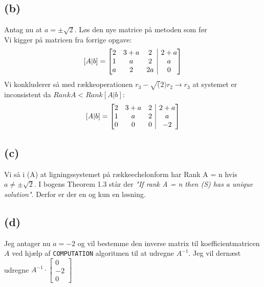 \documentclass[a4paper,fleqn]{article}
\begin{document}
	\subsection{(b)}
	Antag nu at $a = \pm\sqrt{2}$. Løs den nye matrice på metoden som før\\
	Vi kigger på matricen fra forrige opgave:
	\[ [A|b] = \left[\begin{array}{@{}ccc|c@{}}
		2	&	3+a	&	2	& 2+a\\
		1	&	a	&	2	& a\\
		a	&	2	&	2a	& 0
	\end{array} \right]\]
	Vi konkluderer så med rækkeoperationen $r_3 - \sqrt(2)r_2 \rightarrow r_3$ at systemet er
	inconsistent da $Rank A < Rank [A|b]$:
	\[ [A|b] = \left[\begin{array}{@{}ccc|c@{}}
		2	&	3+a	&	2	& 2+a\\
		1	&	a	&	2	& a\\
		0	&	0	&	0	& -2
	\end{array} \right]\]

	\subsection{(c)}
	Vi så i (A) at ligningssystemet på rækkeechelonform har Rank A = n hvis $a \neq\pm\sqrt{2}$.
	I bogens Theorem 1.3 står der \emph{"If rank A = n then (S) has a unique solution"}.
	Derfor er der en og kun en løsning.

	\subsection{(d)}
	Jeg antager nu $a = -2$ og vil bestemme den inverse matrix til koefficientmatricen $A$ ved
	hjælp af \verb!COMPUTATION! algoritmen til at udregne $A^{-1}$. Jeg vil dernæst udregne
	$A^{-1}\cdot\begin{bmatrix}0\\-2\\0\end{bmatrix}$
\end{document}

